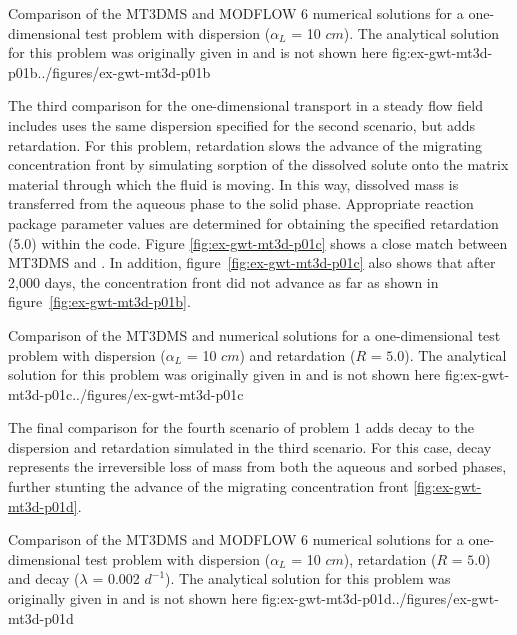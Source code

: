 \begin{StandardFigure}
	{Comparison of the MT3DMS and MODFLOW 6 numerical solutions for a one-dimensional test problem with dispersion ($\alpha_L$ = 10 $cm$).  The analytical solution for this problem was originally given in \cite{vanGenuchtenAlves1982} and is not shown here}
	{fig:ex-gwt-mt3d-p01b}{../figures/ex-gwt-mt3d-p01b}
\end{StandardFigure}

The third comparison for the one-dimensional transport in a steady flow field includes uses the same dispersion specified for the second scenario, but adds retardation.  For this problem, retardation slows the advance of the migrating concentration front by simulating sorption of the dissolved solute onto the matrix material through which the fluid is moving. In this way, dissolved mass is transferred from the aqueous phase to the solid phase. Appropriate reaction package parameter values are determined for obtaining the specified retardation (5.0) within the code. Figure \ref{fig:ex-gwt-mt3d-p01c} shows a close match between MT3DMS and \mf. In addition, figure~\ref{fig:ex-gwt-mt3d-p01c} also shows that after 2,000 days, the concentration front did not advance as far as shown in figure~\ref{fig:ex-gwt-mt3d-p01b}.

\begin{StandardFigure}
	{Comparison of the MT3DMS and \mf numerical solutions for a one-dimensional test problem with dispersion ($\alpha_L$ = 10 $cm$) and retardation ($R$ = $5.0$). The analytical solution for this problem was originally given in \cite{vanGenuchtenAlves1982} and is not shown here}
	{fig:ex-gwt-mt3d-p01c}{../figures/ex-gwt-mt3d-p01c}
\end{StandardFigure}

The final comparison for the fourth scenario of problem 1 adds decay to the dispersion and retardation simulated in the third scenario. For this case, decay represents the irreversible loss of mass from both the aqueous and sorbed phases, further stunting the advance of the migrating concentration front \ref{fig:ex-gwt-mt3d-p01d}.  

\begin{StandardFigure}
	{Comparison of the MT3DMS and MODFLOW 6 numerical solutions for a one-dimensional test problem with dispersion ($\alpha_L$ = 10 $cm$), retardation ($R$ = $5.0$) and decay ($\lambda$ = 0.002 $d^{-1}$).  The analytical solution for this problem was originally given in \cite{vanGenuchtenAlves1982} and is not shown here}
	{fig:ex-gwt-mt3d-p01d}{../figures/ex-gwt-mt3d-p01d}
\end{StandardFigure}



